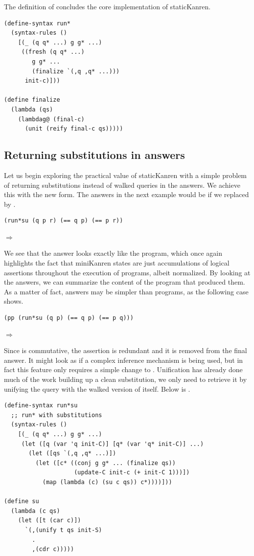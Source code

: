 The definition of  concludes the core implementation of staticKanren.
\begin{lstlisting}
(define-syntax run*
  (syntax-rules ()
    [(_ (q q* ...) g g* ...)
     ((fresh (q q* ...)
        g g* ...
        (finalize `(,q ,q* ...)))
      init-c)]))

(define finalize
  (lambda (qs)
    (lambdag@ (final-c)
      (unit (reify final-c qs)))))
\end{lstlisting}

\subsection{Returning substitutions in answers}\label{S}
Let us begin exploring the practical value of staticKanren with a simple problem of returning substitutions instead of walked queries in the answers. We achieve this with the new  form. The answers in the next example would be  if we replaced  by .
\begin{lstlisting}
(run*su (q p r) (== q p) (== p r))
\end{lstlisting}
$\Rightarrow$ 

We see that the answer looks exactly like the program, which once again highlights the fact that miniKanren states are just accumulations of logical assertions throughout the execution of programs, albeit normalized. By looking at the answers, we can summarize the content of the program that produced them. As a matter of fact, answers may be simpler than programs, as the following case shows.
\begin{lstlisting}
(pp (run*su (q p) (== q p) (== p q)))
\end{lstlisting}
$\Rightarrow$ 

Since \code{==} is commutative, the assertion  is redundant and it is removed from the final answer. It might look as if a complex inference mechanism is being used, but in fact this feature only requires a simple change to . Unification has already done much of the work building up a clean substitution, we only need to retrieve it by unifying the query with the walked version of itself. Below is .
\begin{lstlisting}
(define-syntax run*su
  ;; run* with substitutions
  (syntax-rules ()
    [(_ (q q* ...) g g* ...)
     (let ([q (var 'q init-C)] [q* (var 'q* init-C)] ...)
       (let ([qs `(,q ,q* ...)])
         (let ([c* ((conj g g* ... (finalize qs))
                    (update-C init-c (+ init-C 1)))])
           (map (lambda (c) (su c qs)) c*))))]))

(define su
  (lambda (c qs)
    (let ([t (car c)])
      `(,(unify t qs init-S)
        .
        ,(cdr c)))))
\end{lstlisting}

